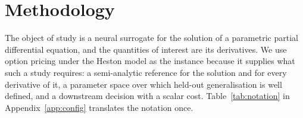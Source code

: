 \documentclass{article}
\begin{document}
\section{Methodology}
\label{sec:method}

The object of study is a neural surrogate for the solution of a parametric partial
differential equation, and the quantities of interest are its derivatives. We use
option pricing under the Heston model \citep{heston1993closed} as the instance
because it supplies what such a study requires: a semi-analytic reference for the
solution and for every derivative of it, a parameter space over which held-out
generalisation is well defined, and a downstream decision with a scalar cost.
Table~\ref{tab:notation} in Appendix~\ref{app:config} translates the notation once.
\end{document}
